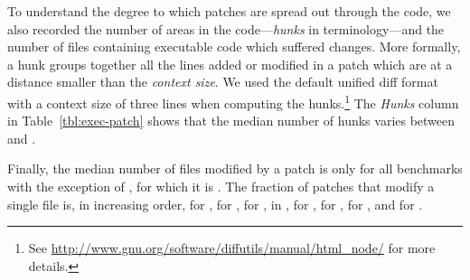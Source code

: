
To understand the degree to which patches are spread out through the
code, we also recorded the number of areas in the
code---\textit{hunks} in \git terminology---and the number of files
containing executable code which suffered changes.  More formally, a
hunk groups together all the lines added or modified in a patch which
are at a distance smaller than the \textit{context size}.  We used the
default unified diff format with a context size of three lines when
computing the
hunks.\footnote{See \url{http://www.gnu.org/software/diffutils/manual/html_node/}
for more details.}  The \textit{Hunks} column in
Table~\ref{tbl:exec-patch} shows that the median number of hunks
varies between \binutilseHunkThreeMedian and \zeromqeHunkThreeMedian.

Finally, the median number of files modified by a patch is
only \rediseFileMedian for all benchmarks with the exception
of \zeromq, for which it is \zeromqeFileMedian. The fraction of
patches that modify a single file is, in increasing
order, \vimOneeFilePatches for \vim, \zeromqOneeFilePatches for \zeromq,
\gitOneeFilePatches for \git, \beanstalkdOneeFilePatches in \beanstalkd,
\lighttpdtwoOneeFilePatches for \lighttpdtwo, \memcachedOneeFilePatches for
\memcached, \redisOneeFilePatches for \redis, and \binutilsOneeFilePatches for
\binutils.


